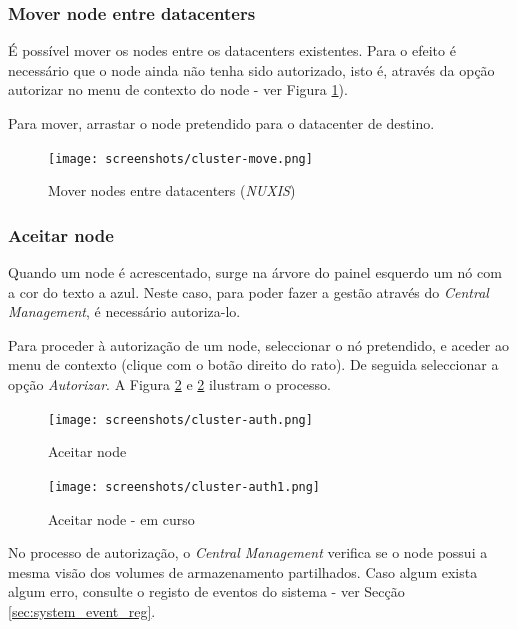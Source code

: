 {\subsubsection{Mover node entre datacenters}
É possível mover os nodes entre os datacenters existentes. Para o efeito é necessário que o node ainda não tenha sido autorizado, isto é, através da opção autorizar no menu de contexto do node - ver Figura \ref{fig:cluster-move}).

Para mover, arrastar o node pretendido para o datacenter de destino.

\begin{figure}[H]
        \begin{center}
        \texttt{[image: screenshots/cluster-move.png]}
        \caption{Mover nodes entre datacenters (\emph{NUXIS})}
        \label{fig:cluster-move}
        \end{center}
\end{figure}

\subsubsection{Aceitar node}
Quando um node é acrescentado, surge na árvore do painel esquerdo um nó com a cor do texto a azul. Neste caso, para poder fazer a gestão através do \textit{Central Management}, é necessário autoriza-lo.

Para proceder à autorização de um node, seleccionar o nó pretendido, e aceder ao menu de contexto (clique com o botão direito do rato). De seguida seleccionar a opção \textit{Autorizar}. A Figura \ref{fig:cluster-auth} e \ref{fig:cluster-auth} ilustram o processo.

\begin{figure}[H]
        \begin{center}
        \texttt{[image: screenshots/cluster-auth.png]}
        \caption{Aceitar node}
        \label{fig:cluster-auth}
        \end{center}
\end{figure}

\begin{figure}[H]
        \begin{center}
        \texttt{[image: screenshots/cluster-auth1.png]}
        \caption{Aceitar node - em curso}
        \label{fig:cluster-auth1}
        \end{center}
\end{figure}

No processo de autorização, o \textit{Central Management} verifica se o node possui a mesma visão dos volumes de armazenamento partilhados. Caso algum exista algum erro, consulte o registo de eventos do sistema - ver Secção \ref{sec:system_event_reg}.
} %
 
